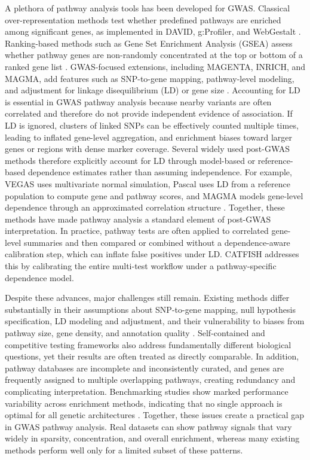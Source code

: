 \documentclass[unnumsec,webpdf,contemporary,large]{oup-authoring-template}%
\theoremstyle{thmstyleone}%
\theoremstyle{thmstyletwo}%
\theoremstyle{thmstylethree}%
\begin{document}
A plethora of pathway analysis tools has been developed for GWAS. Classical over-representation methods test whether predefined pathways are enriched among significant genes, as implemented in DAVID, g:Profiler, and WebGestalt \citep{Sherman2022,Kolberg2023,Liao2019}. Ranking-based methods such as Gene Set Enrichment Analysis (GSEA) assess whether pathway genes are non-randomly concentrated at the top or bottom of a ranked gene list \citep{Subramanian2005}. GWAS-focused extensions, including MAGENTA, INRICH, and MAGMA, add features such as SNP-to-gene mapping, pathway-level modeling, and adjustment for linkage disequilibrium (LD) or gene size \citep{Segre2010,Lee2012,deLeeuw2015}. Accounting for LD is essential in GWAS pathway analysis because nearby variants are often correlated and therefore do not provide independent evidence of association. If LD is ignored, clusters of linked SNPs can be effectively counted multiple times, leading to inflated gene-level aggregation, and enrichment biases toward larger genes or regions with dense marker coverage. Several widely used post-GWAS methods therefore explicitly account for LD through model-based or reference-based dependence estimates rather than assuming independence. For example, VEGAS uses multivariate normal simulation, Pascal uses LD from a reference population to compute gene and pathway scores, and MAGMA models gene-level dependence through an approximated correlation structure \citep{Liu2010,deLeeuw2015,Lamparter2016,Watanabe2017}. Together, these methods have made pathway analysis a standard element of post-GWAS interpretation. In practice, pathway tests are often applied to correlated gene-level summaries and then compared or combined without a dependence-aware calibration step, which can inflate false positives under LD. CATFISH addresses this by calibrating the entire multi-test workflow under a pathway-specific dependence model.

Despite these advances, major challenges still remain. Existing methods differ substantially in their assumptions about SNP-to-gene mapping, null hypothesis specification, LD modeling and adjustment, and their vulnerability to biases from pathway size, gene density, and annotation quality \citep{Mooney2015,Debrabant2017}. Self-contained and competitive testing frameworks also address fundamentally different biological questions, yet their results are often treated as directly comparable. In addition, pathway databases are incomplete and inconsistently curated, and genes are frequently assigned to multiple overlapping pathways, creating redundancy and complicating interpretation. Benchmarking studies show marked performance variability across enrichment methods, indicating that no single approach is optimal for all genetic architectures \citep{Geistlinger2021}. Together, these issues create a practical gap in GWAS pathway analysis. Real datasets can show pathway signals that vary widely in sparsity, concentration, and overall enrichment, whereas many existing methods perform well only for a limited subset of these patterns.
\end{document}
